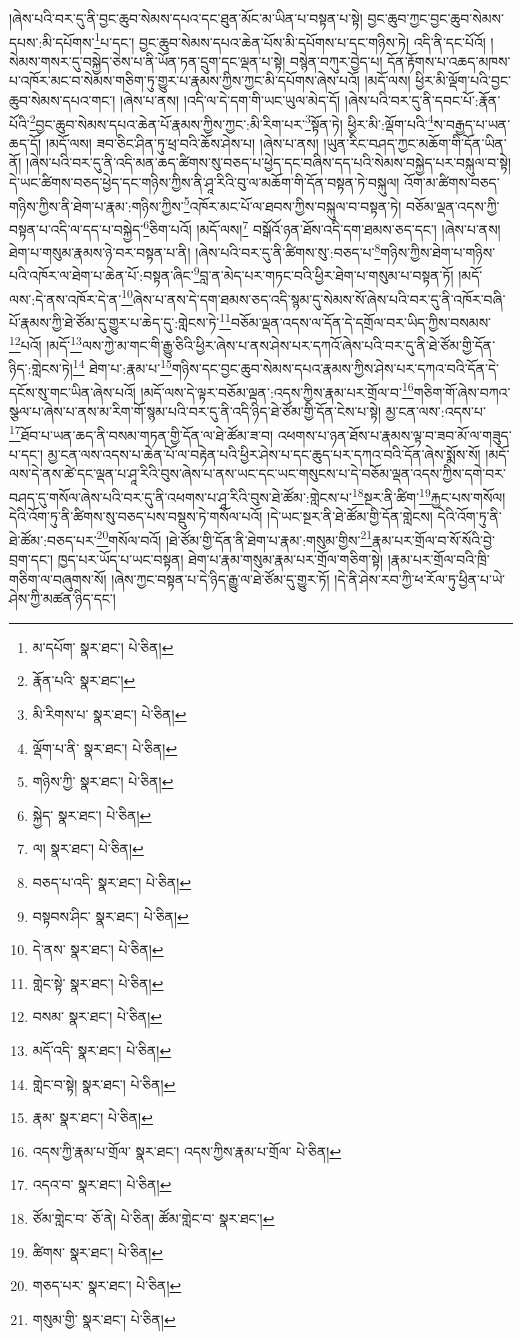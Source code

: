 །ཞེས་པའི་བར་དུ་ནི་བྱང་ཆུབ་སེམས་དཔའ་དང་ཐུན་མོང་མ་ཡིན་པ་བསྟན་པ་སྟེ། བྱང་ཆུབ་ཀྱང་བྱང་ཆུབ་སེམས་དཔས་:མི་དཔོགས་\footnote{མ་དཔོག་  སྣར་ཐང་།  པེ་ཅིན། }པ་དང་། བྱང་ཆུབ་སེམས་དཔའ་ཆེན་པོས་མི་དཔོགས་པ་དང་གཉིས་ཏེ། འདི་ནི་དང་པོའོ། །སེམས་གསར་དུ་བསྐྱེད་ཅེས་པ་ནི་ཡོན་ཏན་དྲུག་དང་ལྡན་པ་སྟེ། བསྙེན་བཀུར་བྱེད་པ། དོན་རྟོགས་པ་འཆད་མཁས་པ་འཁོར་མང་བ་སེམས་གཅིག་ཏུ་གྱུར་པ་རྣམས་ཀྱིས་ཀྱང་མི་དཔོགས་ཞེས་པའོ། །མདོ་ལས། ཕྱིར་མི་ལྡོག་པའི་བྱང་ཆུབ་སེམས་དཔའ་གང་། །ཞེས་པ་ནས། །འདི་ལ་དེ་དག་གི་ཡང་ཡུལ་མེད་དོ། །ཞེས་པའི་བར་དུ་ནི་དབང་པོ་:རྣོན་པོའི་\footnote{རྣོན་པའི་  སྣར་ཐང་། }བྱང་ཆུབ་སེམས་དཔའ་ཆེན་པོ་རྣམས་ཀྱིས་ཀྱང་:མི་རིག་པར་\footnote{མི་རིགས་པ་  སྣར་ཐང་།  པེ་ཅིན། }སྟོན་ཏེ། ཕྱིར་མི་:ལྡོག་པའི་\footnote{ལྡོག་པ་ནི་  སྣར་ཐང་།  པེ་ཅིན། }ས་བརྒྱད་པ་ཡན་ཆད་དོ། །མདོ་ལས། ཟབ་ཅིང་ཤིན་ཏུ་ཕྲ་བའི་ཆོས་ཤེས་པ། །ཞེས་པ་ནས། །ཡུན་རིང་བཤད་ཀྱང་མཆོག་གི་དོན་ཡིན་ནོ། །ཞེས་པའི་བར་དུ་ནི་འདི་མན་ཆད་ཚིགས་སུ་བཅད་པ་ཕྱེད་དང་བཞིས་དད་པའི་སེམས་བསྐྱེད་པར་བསྐུལ་བ་སྟེ། དེ་ཡང་ཚིགས་བཅད་ཕྱེད་དང་གཉིས་ཀྱིས་ནི་ཤཱ་རིའི་བུ་ལ་མཆོག་གི་དོན་བསྟན་ཏེ་བསྐུལ། འོག་མ་ཚིགས་བཅད་གཉིས་ཀྱིས་ནི་ཐེག་པ་རྣམ་:གཉིས་ཀྱིས་\footnote{གཉིས་ཀྱི་  སྣར་ཐང་།  པེ་ཅིན། }འཁོར་མང་པོ་ལ་ཐབས་ཀྱིས་བསྐུལ་བ་བསྟན་ཏེ། བཅོམ་ལྡན་འདས་ཀྱི་བསྟན་པ་འདི་ལ་དད་པ་བསྐྱེད་\footnote{སྐྱེད་  སྣར་ཐང་།  པེ་ཅིན། }ཅིག་པའོ། །མདོ་ལས།\footnote{ལ།  སྣར་ཐང་།  པེ་ཅིན། } བསྒོའོ་ཉན་ཐོས་འདི་དག་ཐམས་ཅད་དང་། །ཞེས་པ་ནས། ཐེག་པ་གསུམ་རྣམས་ཉེ་བར་བསྟན་པ་ནི། །ཞེས་པའི་བར་དུ་ནི་ཚིགས་སུ་:བཅད་པ་\footnote{བཅད་པ་འདི་  སྣར་ཐང་།  པེ་ཅིན། }གཉིས་ཀྱིས་ཐེག་པ་གཉིས་པའི་འཁོར་ལ་ཐེག་པ་ཆེན་པོ་:བསྟན་ཞིང་\footnote{བསྟབས་ཤིང་  སྣར་ཐང་།  པེ་ཅིན། }བླ་ན་མེད་པར་གཏང་བའི་ཕྱིར་ཐེག་པ་གསུམ་པ་བསྟན་ཏོ། །མདོ་ལས་:དེ་ནས་འཁོར་དེ་ན་\footnote{དེ་ནས་  སྣར་ཐང་།  པེ་ཅིན། }ཞེས་པ་ནས་དེ་དག་ཐམས་ཅད་འདི་སྙམ་དུ་སེམས་སོ་ཞེས་པའི་བར་དུ་ནི་འཁོར་བཞི་པོ་རྣམས་ཀྱི་ཐེ་ཙོམ་དུ་གྱུར་པ་ཆེད་དུ་:གླེངས་ཏེ་\footnote{གླེང་སྟེ་  སྣར་ཐང་།  པེ་ཅིན། }བཅོམ་ལྡན་འདས་ལ་དོན་དེ་དགྲོལ་བར་ཡིད་ཀྱིས་བསམས་\footnote{བསམ་  སྣར་ཐང་།  པེ་ཅིན། }པའོ། །མདོ་\footnote{མདོ་འདི་  སྣར་ཐང་།  པེ་ཅིན། }ལས་ཀྱེ་མ་གང་གི་རྒྱུ་ཅིའི་ཕྱིར་ཞེས་པ་ནས་ཤེས་པར་དཀའོ་ཞེས་པའི་བར་དུ་ནི་ཐེ་ཙོམ་གྱི་དོན་ཉིད་:གླེངས་ཏེ།\footnote{གླེང་བ་སྟེ།  སྣར་ཐང་།  པེ་ཅིན། } ཐེག་པ་:རྣམ་པ་\footnote{རྣམ་  སྣར་ཐང་།  པེ་ཅིན། }གཉིས་དང་བྱང་ཆུབ་སེམས་དཔའ་རྣམས་ཀྱིས་ཤེས་པར་དཀའ་བའི་དོན་དེ་དངོས་སུ་གང་ཡིན་ཞེས་པའོ། །མདོ་ལས་དེ་ལྟར་བཅོམ་ལྡན་:འདས་ཀྱིས་རྣམ་པར་གྲོལ་བ་\footnote{འདས་ཀྱི་རྣམ་པ་གྲོལ་  སྣར་ཐང་། འདས་ཀྱིས་རྣམ་པ་གྲོལ་  པེ་ཅིན། }གཅིག་གོ་ཞེས་བཀའ་སྩལ་པ་ཞེས་པ་ནས་མ་རིག་གོ་སྙམ་པའི་བར་དུ་ནི་འདི་ཉིད་ཐེ་ཙོམ་གྱི་དོན་ངེས་པ་སྟེ། མྱ་ངན་ལས་:འདས་པ་\footnote{འདའ་བ་  སྣར་ཐང་།  པེ་ཅིན། }ཐོབ་པ་ཡན་ཆད་ནི་བསམ་གཏན་གྱི་དོན་ལ་ཐེ་ཚོམ་ཟ་བ། འཕགས་པ་ཉན་ཐོས་པ་རྣམས་ལྟ་བ་ཟབ་མོ་ལ་གཟུད་པ་དང་། མྱ་ངན་ལས་འདས་པ་ཆེན་པོ་ལ་བརྟེན་པའི་ཕྱིར་ཤེས་པ་དང་ཆུད་པར་དཀའ་བའི་དོན་ཞེས་སྨོས་སོ། །མདོ་ལས་དེ་ནས་ཚེ་དང་ལྡན་པ་ཤཱ་རིའི་བུས་ཞེས་པ་ནས་ཡང་དང་ཡང་གསུངས་པ་དེ་བཅོམ་ལྡན་འདས་ཀྱིས་དགེ་བར་བཤད་དུ་གསོལ་ཞེས་པའི་བར་དུ་ནི་འཕགས་པ་ཤཱ་རིའི་བུས་ཐེ་ཚོམ་:གླེངས་པ་\footnote{ཙོམ་གླེང་བ་  ཅོ་ནེ།  པེ་ཅིན། ཚོམ་གླེང་བ་  སྣར་ཐང་། }སྔར་ནི་ཚིག་\footnote{ཚིགས་  སྣར་ཐང་།  པེ་ཅིན། }རྐྱང་པས་གསོལ། དེའི་འོག་ཏུ་ནི་ཚིགས་སུ་བཅད་པས་བསྡུས་ཏེ་གསོལ་པའོ། །དེ་ཡང་སྔར་ནི་ཐེ་ཚོམ་གྱི་དོན་གླེངས། དེའི་འོག་ཏུ་ནི་ཐེ་ཚོམ་:བཅད་པར་\footnote{གཅད་པར་  སྣར་ཐང་།  པེ་ཅིན། }གསོལ་བའོ། །ཐེ་ཙོམ་གྱི་དོན་ནི་ཐེག་པ་རྣམ་:གསུམ་གྱིས་\footnote{གསུམ་གྱི་  སྣར་ཐང་།  པེ་ཅིན། }རྣམ་པར་གྲོལ་བ་སོ་སོའི་བྱེ་བྲག་དང་། ཁྱད་པར་ཡོད་པ་ཡང་བསྟན། ཐེག་པ་རྣམ་གསུམ་རྣམ་པར་གྲོལ་གཅིག་སྟེ། །རྣམ་པར་གྲོལ་བའི་ཁྲི་གཅིག་ལ་བཞུགས་སོ། །ཞེས་ཀྱང་བསྟན་པ་དེ་ཉིད་རྒྱུ་ལ་ཐེ་ཙོམ་དུ་གྱུར་ཏོ། །དེ་ནི་ཤེས་རབ་ཀྱི་ཕ་རོལ་ཏུ་ཕྱིན་པ་ཡེ་ཤེས་ཀྱི་མཚན་ཉིད་དང་། 